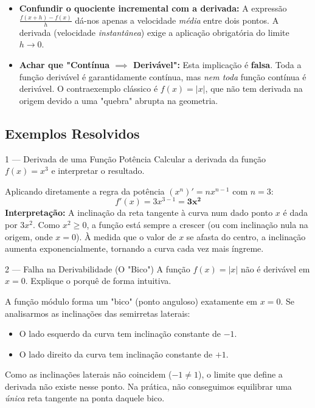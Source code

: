 \begin{warnbox}[title={Erros Comuns na Derivação}]
  \begin{itemize}
      \item \textbf{Confundir o quociente incremental com a derivada:} A expressão $\frac{f(x+h)-f(x)}{h}$ dá-nos apenas a velocidade \emph{média} entre dois pontos. A derivada (velocidade \emph{instantânea}) exige a aplicação obrigatória do limite $h \to 0$.
      \item \textbf{Achar que "Contínua $\implies$ Derivável":} Esta implicação é \textbf{falsa}. Toda a função derivável é garantidamente contínua, mas \emph{nem toda} função contínua é derivável. O contraexemplo clássico é $f(x) = |x|$, que não tem derivada na origem devido a uma "quebra" abrupta na geometria.
  \end{itemize}
\end{warnbox}

\subsection{Exemplos Resolvidos}

\begin{exbox}{1 --- Derivada de uma Função Potência}
  Calcular a derivada da função $f(x)=x^3$ e interpretar o resultado.
\end{exbox}
\begin{solbox}
  Aplicando diretamente a regra da potência $(x^n)' = n x^{n-1}$ com $n=3$:
  \[
    f'(x) = 3x^{3-1} = \mathbf{3x^2}
  \]
  \textbf{Interpretação:} A inclinação da reta tangente à curva num dado ponto $x$ é dada por $3x^2$. Como $x^2 \ge 0$, a função está sempre a crescer (ou com inclinação nula na origem, onde $x=0$). À medida que o valor de $x$ se afasta do centro, a inclinação aumenta exponencialmente, tornando a curva cada vez mais íngreme.
\end{solbox}

\begin{exbox}{2 --- Falha na Derivabilidade (O "Bico")}
  A função $f(x)=|x|$ não é derivável em $x=0$. Explique o porquê de forma intuitiva.
\end{exbox}
\begin{solbox}
  A função módulo forma um "bico" (ponto anguloso) exatamente em $x=0$.
  Se analisarmos as inclinações das semirretas laterais:
  \begin{itemize}
      \item O lado esquerdo da curva tem inclinação constante de $-1$.
      \item O lado direito da curva tem inclinação constante de $+1$.
  \end{itemize}
  Como as inclinações laterais não coincidem ($-1 \neq 1$), o limite que define a derivada não existe nesse ponto. Na prática, não conseguimos equilibrar uma \emph{única} reta tangente na ponta daquele bico.
\end{solbox}

